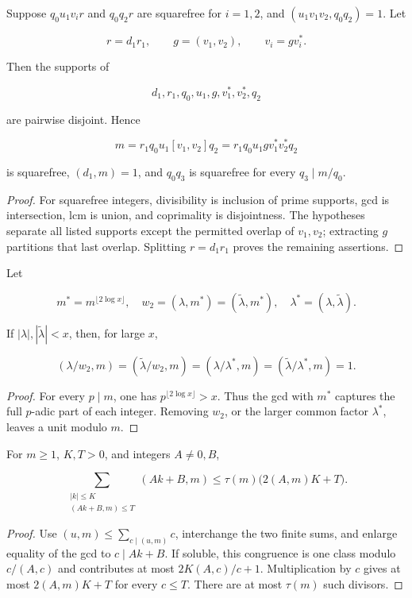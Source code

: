 \begin{lemma}\label{lem:prime-support}
Suppose $q_0u_1v_ir$ and $q_0q_2r$ are squarefree for $i=1,2$, and
$(u_1v_1v_2,q_0q_2)=1$.  Let

\[
 r=d_1r_1,\qquad g=(v_1,v_2),\qquad v_i=gv_i^*.
\]

Then the supports of

\[
 d_1,r_1,q_0,u_1,g,v_1^*,v_2^*,q_2
\]

are pairwise disjoint.  Hence

\begin{equation}\label{eq:m}
 m=r_1q_0u_1[v_1,v_2]q_2
 =r_1q_0u_1gv_1^*v_2^*q_2
\end{equation}

is squarefree, $(d_1,m)=1$, and $q_0q_3$ is squarefree for every
$q_3\mid m/q_0$.
\end{lemma}

\begin{proof}
For squarefree integers, divisibility is inclusion of prime supports, gcd is
intersection, lcm is union, and coprimality is disjointness.  The hypotheses
separate all listed supports except the permitted overlap of $v_1,v_2$;
extracting $g$ partitions that last overlap.  Splitting $r=d_1r_1$ proves
the remaining assertions.
\end{proof}

\begin{lemma}\label{lem:valuation}
Let

\[
 m^*=m^{\lfloor2\log x\rfloor},\quad
 w_2=(\lambda,m^*)=(\widetilde\lambda,m^*),\quad
 \lambda^*=(\lambda,\widetilde\lambda).
\]

If $|\lambda|,|\widetilde\lambda|<x$, then, for large $x$,

\[
 (\lambda/w_2,m)=(\widetilde\lambda/w_2,m)
 =(\lambda/\lambda^*,m)=(\widetilde\lambda/\lambda^*,m)=1.
\]
\end{lemma}

\begin{proof}
For every $p\mid m$, one has
$p^{\lfloor2\log x\rfloor}>x$.  Thus the gcd with $m^*$ captures the full
$p$-adic part of each integer.  Removing $w_2$, or the larger common factor
$\lambda^*$, leaves a unit modulo $m$.
\end{proof}

\begin{lemma}
\label{lem:gcd-average}
For $m\ge1$, $K,T>0$, and integers $A\ne0,B$,

\begin{equation}\label{eq:gcd-average}
 \sum_{\substack{|k|\le K\\(Ak+B,m)\le T}}(Ak+B,m)
 \le\tau(m)\bigl(2(A,m)K+T\bigr).
\end{equation}
\end{lemma}

\begin{proof}
Use $(u,m)\le\sum_{c\mid(u,m)}c$, interchange the two finite sums, and
enlarge equality of the gcd to $c\mid Ak+B$.  If soluble, this congruence
is one class modulo $c/(A,c)$ and contributes at most
$2K(A,c)/c+1$.  Multiplication by $c$ gives at most
$2(A,m)K+T$ for every $c\le T$.  There are at most $\tau(m)$ such divisors.
\end{proof}
